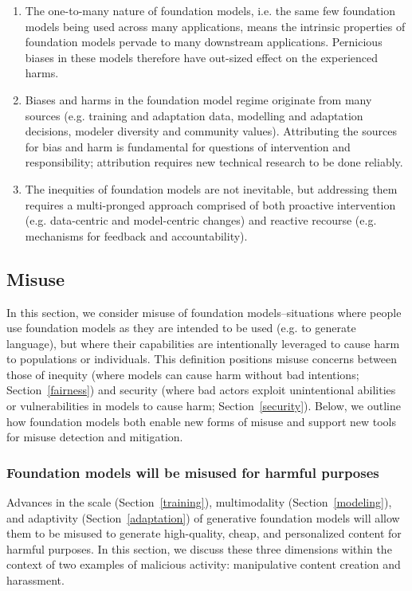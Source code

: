 \begin{enumerate}
    \item The one-to-many nature of foundation models, i.e. the same few foundation models being used across many applications, means the intrinsic properties of foundation models pervade to many downstream applications. Pernicious biases in these models therefore have out-sized effect on the experienced harms.
    \item 
    Biases and harms in the foundation model regime originate from many sources (e.g. training and adaptation data, modelling and adaptation decisions, modeler diversity and community values). Attributing the sources for bias and harm is fundamental for questions of intervention and responsibility; attribution requires new technical research to be done reliably.
    \item 
    The inequities of foundation models are not inevitable, but addressing them requires a multi-pronged approach comprised of both proactive intervention (e.g. data-centric and model-centric changes) and reactive recourse (e.g. mechanisms for feedback and accountability).
\end{enumerate}

\newsection
\subsection{Misuse} 
\label{sec:misuse}

In this section, we consider misuse of foundation models--situations where people use foundation models as they are intended to be used (e.g. to generate language), but where their capabilities are intentionally leveraged to cause harm to populations or individuals. This definition positions misuse concerns between those of inequity (where models can cause harm without bad intentions; Section~\ref{fairness}) and security (where bad actors exploit unintentional abilities or vulnerabilities in models to cause harm; Section~\ref{security}). 
Below, we outline how foundation models both enable new forms of misuse and support new tools for misuse detection and mitigation. 

\subsubsection{Foundation models will be misused for harmful purposes} Advances in the scale (Section~\ref{training}),  multimodality (Section~\ref{modeling}), and adaptivity (Section~\ref{adaptation}) of generative foundation models will allow them to be misused to generate high-quality, cheap, and personalized content for harmful purposes. In this section, we discuss these three dimensions within the context of two examples of malicious activity: manipulative content creation and harassment. 

